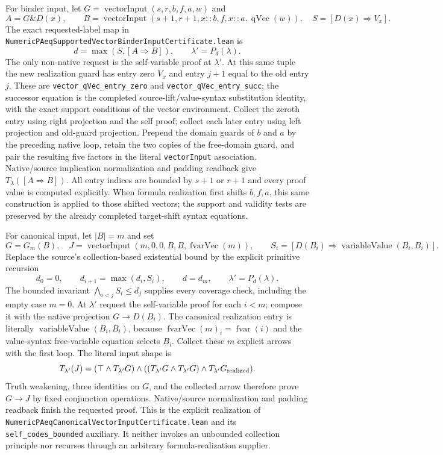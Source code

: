 For binder input, let
$G=\operatorname{vectorInput}(s,r,b,f,a,w)$ and
\[
 A=G\mathbin\&D(x),\qquad
 B=\operatorname{vectorInput}
       (s+1,r+1,x::b,f,x::a,\operatorname{qVec}(w)),
 \quad S=[D(x)\Rightarrow V_x].
\]
The exact requested-label map in
\texttt{NumericPAeqSupportedVectorBinderInputCertificate.lean} is
\[
 d=\max(S,[A\Rightarrow B]),\qquad
 \lambda'=P_d(\lambda).
 \tag{T15}
\]
The only non-native request is the self-variable proof at $\lambda'$.
At this same tuple the new realization guard has entry zero $V_x$
and entry $j+1$ equal to the old entry $j$.  These are
\texttt{vector\_qVec\_entry\_zero} and
\texttt{vector\_qVec\_entry\_succ}; the successor equation is
the completed source-lift/value-syntax substitution identity, with
the exact support conditions of the vector environment.
Collect the zeroth entry using right projection and the self proof;
collect each later entry using left projection and old-guard
projection.  Prepend the domain guards of $b$ and $a$ by the
preceding native loop, retain the two copies of the free-domain
guard, and pair the resulting five factors in the literal
\texttt{vectorInput} association.  Native/source implication
normalization and padding readback give $T_\lambda([A\Rightarrow B])$.
All entry indices are bounded by $s+1$ or $r+1$ and every proof
value is computed explicitly.  When formula realization first
shifts $b,f,a$, this same construction is applied to those shifted
vectors; the support and validity tests are preserved by the
already completed target-shift syntax equations.

For canonical input, let $|B|=m$ and set
\[
 G=G_m(B),\quad
 J=\operatorname{vectorInput}(m,0,0,B,B,\operatorname{fvarVec}(m)),
 \qquad S_i=[D(B_i)\Rightarrow\operatorname{variableValue}(B_i,B_i)].
\]
Replace the source's collection-based existential bound by the
explicit primitive recursion
\[
 d_0=0,\qquad d_{i+1}=\max(d_i,S_i),\qquad
 d=d_m,\qquad \lambda'=P_d(\lambda).
 \tag{T16}
\]
The bounded invariant $\bigwedge_{i<j}S_i\le d_j$ supplies every
coverage check, including the empty case $m=0$.
At $\lambda'$ request the self-variable proof for each $i<m$;
compose it with the native projection $G\to D(B_i)$.
The canonical realization entry is literally
$\operatorname{variableValue}(B_i,B_i)$, because
$\operatorname{fvarVec}(m)_i=\operatorname{fvar}(i)$ and the
value-syntax free-variable equation selects $B_i$.
Collect these $m$ explicit arrows with the first loop.
The literal input shape is
\[
 T_{\lambda'}(J)=
 (\top\wedge T_{\lambda'}G)\wedge
   ((T_{\lambda'}G\wedge T_{\lambda'}G)\wedge
       T_{\lambda'}G_{\rm realized}).
\]
Truth weakening, three identities on $G$, and the collected arrow
therefore prove $G\to J$ by fixed conjunction operations.
Native/source normalization and padding readback finish the
requested proof.  This is the explicit realization of
\texttt{NumericPAeqCanonicalVectorInputCertificate.lean} and its
\texttt{self\_codes\_bounded} auxiliary.  It neither invokes an
unbounded collection principle nor recurses through an arbitrary
formula-realization supplier.

